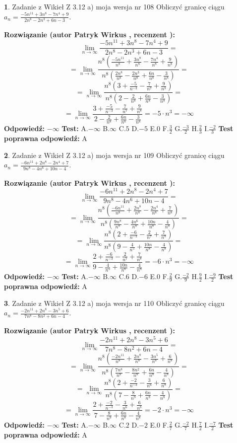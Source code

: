 \documentclass[12pt, a4paper]{article}
\theoremstyle{definition} %
\newtheorem{zad}{}
\newcommand{\zadStart}[1]{\begin{zad}#1\newline}
\newcommand{\zadStop}{\end{zad}}
\newcommand{\rozwStart}[2]{\noindent \textbf{Rozwiązanie (autor #1 , recenzent #2): }\newline}
\newcommand{\rozwStop}{\newline}
\newcommand{\odpStart}{\noindent \textbf{Odpowiedź:}\newline}
\newcommand{\odpStop}{\newline}
\newcommand{\testStart}{\noindent \textbf{Test:}\newline}
\newcommand{\testStop}{\newline}
\newcommand{\kluczStart}{\noindent \textbf{Test poprawna odpowiedź:}\newline}
\newcommand{\kluczStop}{\newline}
\begin{document}
\zadStart{Zadanie z Wikieł Z 3.12 a) moja wersja nr 108}
Obliczyć granicę ciągu $a_{n}=\frac{-5n^{11}+3n^{8}-7n^{4}+9}{2n^{8}-2n^{3}+6n-3}$.
\zadStop
\rozwStart{Patryk Wirkus}{}
$$\lim\limits_{n\to\infty}\frac{-5n^{11}+3n^{8}-7n^{4}+9}{2n^{8}-2n^{3}+6n-3}=$$
$$=\lim\limits_{n\to\infty}\frac{n^{8}\left(\frac{-5n^{11}}{n^{8}}+\frac{3n^{8}}{n^{8}}-\frac{7n^{4}}{n^{8}}+\frac{9}{n^{8}}\right)}{n^{8}\left(\frac{2n^{8}}{n^{8}}-\frac{2n^{3}}{n^{8}}+\frac{6n}{n^{8}}-\frac{3}{n^{8}}\right)}=$$
$$=\lim\limits_{n\to\infty}\frac{n^{8}\left(3+\frac{-5}{n^{-3}}-\frac{7}{n^{7}}+\frac{9}{n^{8}}\right)}
{n^{8}\left(2-\frac{2}{n^{8}}+\frac{6n}{n^{8}}-\frac{3}{n^{8}}\right)}=$$
$$=\lim\limits_{n\to\infty}\frac{3+\frac{-5}{n^{-3}}-\frac{7}{n^{7}}+\frac{9}{n^{8}}}{2-\frac{2}{n^{8}}+\frac{6n}{n^{8}}-\frac{3}{n^{8}}}=-5\cdot n^{3} = -\infty$$
\rozwStop
\odpStart
$-\infty$
\odpStop
\testStart
A.$-\infty$
B.$\infty$
C.$5$
D.$-5$
E.$0$
F.$\frac{3}{2}$
G.$\frac{-3}{2}$
H.$\frac{2}{3}$
I.$\frac{-2}{3}$
\testStop
\kluczStart
A
\kluczStop



\zadStart{Zadanie z Wikieł Z 3.12 a) moja wersja nr 109}
Obliczyć granicę ciągu $a_{n}=\frac{-6n^{11}+2n^{8}-2n^{4}+7}{9n^{8}-4n^{6}+10n-4}$.
\zadStop
\rozwStart{Patryk Wirkus}{}
$$\lim\limits_{n\to\infty}\frac{-6n^{11}+2n^{8}-2n^{4}+7}{9n^{8}-4n^{6}+10n-4}=$$
$$=\lim\limits_{n\to\infty}\frac{n^{8}\left(\frac{-6n^{11}}{n^{8}}+\frac{2n^{8}}{n^{8}}-\frac{2n^{4}}{n^{8}}+\frac{7}{n^{8}}\right)}{n^{8}\left(\frac{9n^{8}}{n^{8}}-\frac{4n^{6}}{n^{8}}+\frac{10n}{n^{8}}-\frac{4}{n^{8}}\right)}=$$
$$=\lim\limits_{n\to\infty}\frac{n^{8}\left(2+\frac{-6}{n^{-3}}-\frac{2}{n^{7}}+\frac{7}{n^{8}}\right)}
{n^{8}\left(9-\frac{4}{n^{5}}+\frac{10n}{n^{8}}-\frac{4}{n^{8}}\right)}=$$
$$=\lim\limits_{n\to\infty}\frac{2+\frac{-6}{n^{-3}}-\frac{2}{n^{7}}+\frac{7}{n^{8}}}{9-\frac{4}{n^{5}}+\frac{10n}{n^{8}}-\frac{4}{n^{8}}}=-6\cdot n^{3} = -\infty$$
\rozwStop
\odpStart
$-\infty$
\odpStop
\testStart
A.$-\infty$
B.$\infty$
C.$6$
D.$-6$
E.$0$
F.$\frac{2}{9}$
G.$\frac{-2}{9}$
H.$\frac{9}{2}$
I.$\frac{-9}{2}$
\testStop
\kluczStart
A
\kluczStop



\zadStart{Zadanie z Wikieł Z 3.12 a) moja wersja nr 110}
Obliczyć granicę ciągu $a_{n}=\frac{-2n^{11}+2n^{8}-3n^{5}+6}{7n^{8}-8n^{2}+6n-4}$.
\zadStop
\rozwStart{Patryk Wirkus}{}
$$\lim\limits_{n\to\infty}\frac{-2n^{11}+2n^{8}-3n^{5}+6}{7n^{8}-8n^{2}+6n-4}=$$
$$=\lim\limits_{n\to\infty}\frac{n^{8}\left(\frac{-2n^{11}}{n^{8}}+\frac{2n^{8}}{n^{8}}-\frac{3n^{5}}{n^{8}}+\frac{6}{n^{8}}\right)}{n^{8}\left(\frac{7n^{8}}{n^{8}}-\frac{8n^{2}}{n^{8}}+\frac{6n}{n^{8}}-\frac{4}{n^{8}}\right)}=$$
$$=\lim\limits_{n\to\infty}\frac{n^{8}\left(2+\frac{-2}{n^{-3}}-\frac{3}{n^{6}}+\frac{6}{n^{8}}\right)}
{n^{8}\left(7-\frac{8}{n^{9}}+\frac{6n}{n^{8}}-\frac{4}{n^{8}}\right)}=$$
$$=\lim\limits_{n\to\infty}\frac{2+\frac{-2}{n^{-3}}-\frac{3}{n^{6}}+\frac{6}{n^{8}}}{7-\frac{8}{n^{9}}+\frac{6n}{n^{8}}-\frac{4}{n^{8}}}=-2\cdot n^{3} = -\infty$$
\rozwStop
\odpStart
$-\infty$
\odpStop
\testStart
A.$-\infty$
B.$\infty$
C.$2$
D.$-2$
E.$0$
F.$\frac{2}{7}$
G.$\frac{-2}{7}$
H.$\frac{7}{2}$
I.$\frac{-7}{2}$
\testStop
\kluczStart
A
\kluczStop
\end{document}
